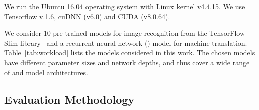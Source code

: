  We run the Ubuntu 16.04 operating system with Linux kernel v4.4.15. We use Tensorflow v.1.6, cuDNN (v6.0) and
CUDA (v8.0.64).


 We consider 10 pre-trained \CNN models for image recognition from the TensorFlow-Slim library~\cite{silberman2013tensorflow} and a recurrent neural network (\RNN) model for machine translation. Table~\ref{tab:workload} lists
the models considered in this work. The chosen models have different parameter sizes and network depths, and thus cover a wide range of
\CNN and \RNN model architectures.




\subsection{Evaluation Methodology \label{sec:method}}


